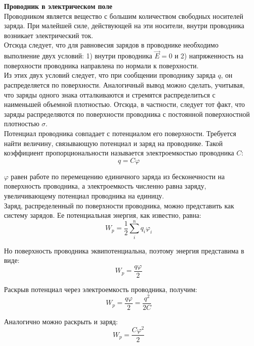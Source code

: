 \documentclass{article}
\begin{document}
	
	\textbf{Проводник в электрическом поле}\\

	Проводником является вещество с большим количеством свободных носителей заряда. При малейшей силе, действующей на эти носители, внутри проводника возникает электрический ток.\\

	Отсюда следует, что для равновесия зарядов в проводнике необходимо выполнение двух условий: 1) внутри проводника $\vec E = 0$ и 2) напряженность на поверхности проводника направлена по нормали к поверхности. \\

	Из этих двух условий следует, что при сообщении проводнику заряда $q$, он распределяется по поверхности. Аналогичный вывод можно сделать, учитывая, что заряды одного знака отталкиваются и стремятся распределиться с наименьшей объемной плотностью. Отсюда, в частности, следует тот факт, что заряды распределяются по поверхности проводника с постоянной поверхностной плотностью $\sigma$.\\

	Потенциал проводника совпадает с потенциалом его поверхности. Требуется найти величину, связывающую потенциал и заряд на проводнике. Такой коэффициент пропорциональности называется электроемкостью проводника $C$:
	\begin{equation}
		q = C\varphi
	\end{equation}

	$\varphi$ равен работе по перемещению единичного заряда из бесконечности на поверхность проводника, а электроемкость численно равна заряду, увеличивающему потенциал проводника на единицу.\\

	Заряд, распределенный по поверхности проводника, можно представить как систему зарядов. Ее потенциальная энергия, как известно, равна:
	\begin{equation}
		W_p = \frac{1}{2}\sum_{i}^n q_i\varphi_i
	\end{equation}

	Но поверхность проводника эквипотенциальна, поэтому энергия представима в виде:
	\begin{equation}
		W_p = \frac{q\varphi}{2}
	\end{equation}

	Раскрыв потенциал через электроемкость проводника, получим:
	\begin{equation}
		W_p = \frac{q\varphi}{2} = \frac{q^2}{2C}
	\end{equation}

	Аналогично можно раскрыть и заряд:
	\begin{equation}
		W_p = \frac{C\varphi^2}{2}
	\end{equation}
\end{document}
